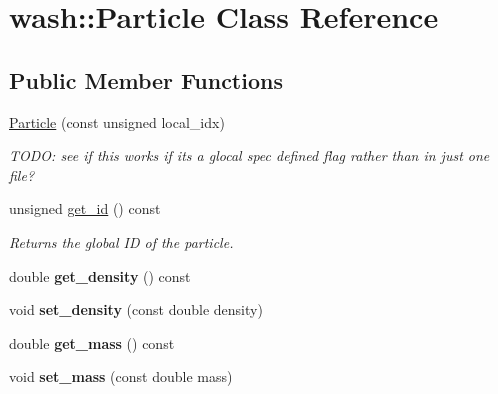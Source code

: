 \hypertarget{classwash_1_1Particle}{}\section{wash\+:\+:Particle Class Reference}
\label{classwash_1_1Particle}
\subsection*{Public Member Functions}
\begin{DoxyCompactItemize}
\item 
\mbox{\label{classwash_1_1Particle_a72131cdf3fdbcada383d81604fd49503}} 
\mbox{\hyperlink{classwash_1_1Particle_a72131cdf3fdbcada383d81604fd49503}{Particle}} (const unsigned local\+\_\+idx)
\begin{DoxyCompactList}\small\item\em T\+O\+DO\+: see if this works if it\textquotesingle{}s a glocal spec defined flag rather than in just one file? \end{DoxyCompactList}\item 
\mbox{\label{classwash_1_1Particle_aef9f2814cc392598de7756e1046fea67}} 
unsigned \mbox{\hyperlink{classwash_1_1Particle_aef9f2814cc392598de7756e1046fea67}{get\+\_\+id}} () const
\begin{DoxyCompactList}\small\item\em Returns the global ID of the particle. \end{DoxyCompactList}\item 
\mbox{\label{classwash_1_1Particle_a8c0ce3f48b189fd8550c3bfab17eec68}} 
double {\bfseries get\+\_\+density} () const
\item 
\mbox{\label{classwash_1_1Particle_a6416678dd509c16c2933d315b6ae6156}} 
void {\bfseries set\+\_\+density} (const double density)
\item 
\mbox{\label{classwash_1_1Particle_a7d8d11b3e4855e66e62ee58b4270cdc1}} 
double {\bfseries get\+\_\+mass} () const
\item 
\mbox{\label{classwash_1_1Particle_a9151ed34c880f63f062381076834223e}} 
void {\bfseries set\+\_\+mass} (const double mass)

\end{DoxyCompactItemize}
